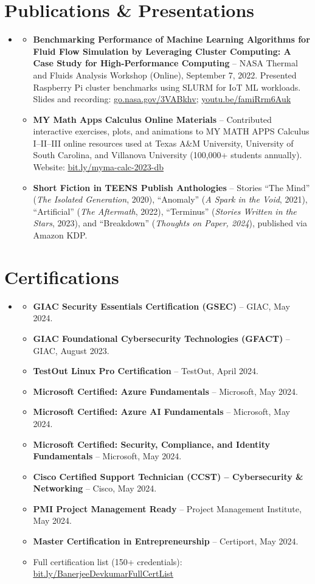 \documentclass[letterpaper,11pt]{article}
\newcommand{\resumeItem}[1]{
  \item\small{
    {#1 \vspace{-2pt}}
  }
}
\newcommand{\resumeSubHeadingListStart}{\begin{itemize}[leftmargin=0.15in, label={}]}
\newcommand{\resumeSubHeadingListEnd}{\end{itemize}}
\newcommand{\resumeItemListStart}{\begin{itemize}}
\newcommand{\resumeItemListEnd}{\end{itemize}\vspace{-5pt}}
\begin{document}
\section{Publications \& Presentations}
\resumeSubHeadingListStart
    \item \resumeItemListStart
        \resumeItem{\textbf{Benchmarking Performance of Machine Learning Algorithms for Fluid Flow Simulation by Leveraging Cluster Computing: A Case Study for High-Performance Computing} -- NASA Thermal and Fluids Analysis Workshop (Online), September 7, 2022. Presented Raspberry Pi cluster benchmarks using SLURM for IoT ML workloads. Slides and recording: \href{https://go.nasa.gov/3VABkhv}{\underline{go.nasa.gov/3VABkhv}}; \href{https://youtu.be/famiRrm6Auk}{\underline{youtu.be/famiRrm6Auk}}}
        \resumeItem{\textbf{MY Math Apps Calculus Online Materials} -- Contributed interactive exercises, plots, and animations to MY MATH APPS Calculus I–II–III online resources used at Texas A\&M University, University of South Carolina, and Villanova University (100,000+ students annually). Website: \href{https://bit.ly/myma-calc-2023-db}{\underline{bit.ly/myma-calc-2023-db}}}
        \resumeItem{\textbf{Short Fiction in TEENS Publish Anthologies} -- Stories ``The Mind'' (\emph{The Isolated Generation}, 2020), ``Anomaly'' (\emph{A Spark in the Void}, 2021), ``Artificial'' (\emph{The Aftermath}, 2022), ``Terminus'' (\emph{Stories Written in the Stars}, 2023), and ``Breakdown'' (\emph{Thoughts on Paper, 2024}), published via Amazon KDP.}
    \resumeItemListEnd
\resumeSubHeadingListEnd

\section{Certifications}
  \resumeSubHeadingListStart
    \item \resumeItemListStart
      \resumeItem{\textbf{GIAC Security Essentials Certification (GSEC)} -- GIAC, May 2024.}
      \resumeItem{\textbf{GIAC Foundational Cybersecurity Technologies (GFACT)} -- GIAC, August 2023.}
      \resumeItem{\textbf{TestOut Linux Pro Certification} -- TestOut, April 2024.}
      \resumeItem{\textbf{Microsoft Certified: Azure Fundamentals} -- Microsoft, May 2024.}
      \resumeItem{\textbf{Microsoft Certified: Azure AI Fundamentals} -- Microsoft, May 2024.}
      \resumeItem{\textbf{Microsoft Certified: Security, Compliance, and Identity Fundamentals} -- Microsoft, May 2024.}
      \resumeItem{\textbf{Cisco Certified Support Technician (CCST) -- Cybersecurity \& Networking} -- Cisco, May 2024.}
      \resumeItem{\textbf{PMI Project Management Ready} -- Project Management Institute, May 2024.}
      \resumeItem{\textbf{Master Certification in Entrepreneurship} -- Certiport, May 2024.}
      \resumeItem{Full certification list (150+ credentials): \href{https://bit.ly/BanerjeeDevkumarFullCertList}{\underline{bit.ly/BanerjeeDevkumarFullCertList}}}
    \resumeItemListEnd
  \resumeSubHeadingListEnd
\end{document}
